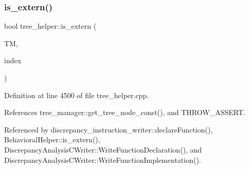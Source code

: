 \subsubsection{\texorpdfstring{is\+\_\+extern()}{is\_extern()}}
{\footnotesize\ttfamily bool tree\+\_\+helper\+::is\+\_\+extern (\begin{DoxyParamCaption}\item[{const \hyperlink{tree__manager_8hpp_a792e3f1f892d7d997a8d8a4a12e39346}{tree\+\_\+manager\+Const\+Ref} \&}]{TM,  }\item[{const unsigned int}]{index }\end{DoxyParamCaption})\hspace{0.3cm}{\ttfamily [static]}}



Definition at line 4500 of file tree\+\_\+helper.\+cpp.



References tree\+\_\+manager\+::get\+\_\+tree\+\_\+node\+\_\+const(), and T\+H\+R\+O\+W\+\_\+\+A\+S\+S\+E\+RT.



Referenced by discrepancy\+\_\+instruction\+\_\+writer\+::declare\+Function(), Behavioral\+Helper\+::is\+\_\+extern(), Discrepancy\+Analysis\+C\+Writer\+::\+Write\+Function\+Declaration(), and Discrepancy\+Analysis\+C\+Writer\+::\+Write\+Function\+Implementation().

